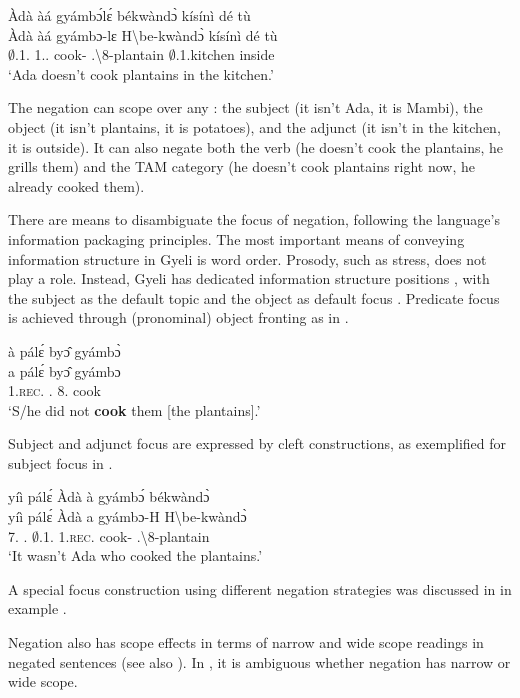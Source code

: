 \documentclass[output=paper,colorlinks=true, citecolor=brown,draftmode]{langscibook}
\begin{document}
\ea\label{Negscope}
  \glll   Àdà àá gyámbɔ́lɛ́ békwàndɔ̀ kísínì dé tù\\
     Àdà àá gyámbɔ-lɛ {H\backslash{}be-kwàndɔ̀} kísínì dé tù\\
    $\emptyset$.1.{\PN} 1.{\PRS}.{\NEG} cook-{\NEG} {{\OBJ}.{\LINK}\backslash{}8-plantain} $\emptyset$.1.kitchen {\LOC} inside \\
    \trans `Ada doesn't cook plantains in the kitchen.'
\z 

The negation can scope over any {\NP}: the subject (it isn't Ada, it is Mambi), the object (it isn't plantains, it is potatoes), and the adjunct (it isn't in the kitchen, it is outside). It can also negate both the verb (he doesn't cook the plantains, he grills them) and the TAM category (he doesn't cook plantains right now, he already cooked them). 

There are means to disambiguate the focus of negation, following the language's information packaging principles. The most important means of conveying information structure in Gyeli is word order. Prosody, such as stress, does not play a role. Instead, Gyeli has dedicated information structure positions \citep{GuldemannEtAl2015},  with the subject as the default topic and the object as default focus \citep{Grimmforth}. 
Predicate focus is achieved through (pronominal) object fronting as in .  

\ea\label{PCF}
\glll à pálɛ́ byɔ̂ gyámbɔ̀\\
    a pálɛ́ byɔ̂ gyámbɔ\\
    1.{\textsc{rec.}\PST} {\PST}.{\NEG} 8.{\OBJ} cook\\
\trans `S/he did not \textbf{cook} them [the plantains].'
\z

Subject and adjunct focus are expressed by cleft constructions, as exemplified for subject focus in .

\ea\label{cleftFOC}
\glll yíì pálɛ́ Àdà à gyámbɔ́ békwàndɔ̀\\
  yíì pálɛ́ Àdà a gyámbɔ-H {H\backslash{}be-kwàndɔ̀}\\
  7.{\COP} {\PST}.{\NEG} $\emptyset$.1.{\PN}   1.{\textsc{rec.}\PST} cook-{\R} {{\OBJ}.{\LINK}\backslash{}8-plantain}\\
\trans `It wasn't Ada who cooked the plantains.'
\z

A special focus construction using different negation strategies was discussed in  in example . 

Negation also has scope effects in terms of narrow and wide scope readings in negated sentences (see also ).  In , it is ambiguous whether negation has narrow or wide scope. 
\end{document}
